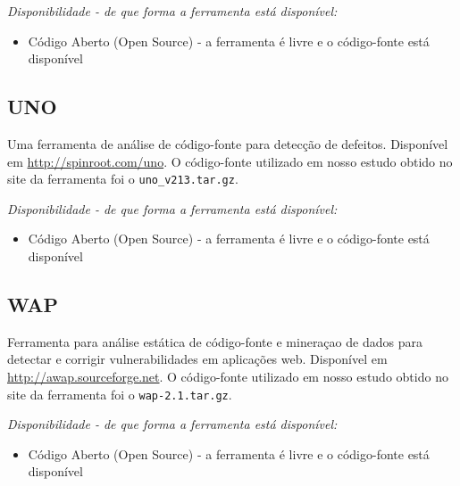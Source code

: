 \begin{description}

  \item {\it Disponibilidade - de que forma a ferramenta está disponível:}
    \begin{itemize}
      \item Código Aberto (Open Source) - a ferramenta é livre e o código-fonte está disponível
    \end{itemize}

\end{description}

\subsection{UNO}

Uma ferramenta de análise de código-fonte para detecção de defeitos.
Disponível em \url{http://spinroot.com/uno}. O código-fonte utilizado em nosso
estudo obtido no site da ferramenta foi o \texttt{uno\_v213.tar.gz}.

\begin{description}

  \item {\it Disponibilidade - de que forma a ferramenta está disponível:}
    \begin{itemize}
      \item Código Aberto (Open Source) - a ferramenta é livre e o código-fonte está disponível
    \end{itemize}

\end{description}

\clearpage

\subsection{WAP}

Ferramenta para análise estática de código-fonte e mineraçao de dados para
detectar e corrigir vulnerabilidades em aplicações web. Disponível em
\url{http://awap.sourceforge.net}. O código-fonte utilizado em nosso estudo
obtido no site da ferramenta foi o \texttt{wap-2.1.tar.gz}.

\begin{description}

  \item {\it Disponibilidade - de que forma a ferramenta está disponível:}
    \begin{itemize}
      \item Código Aberto (Open Source) - a ferramenta é livre e o código-fonte está disponível
    \end{itemize}

\end{description}

